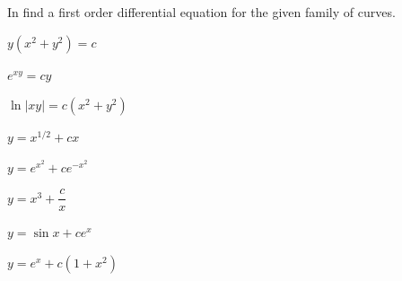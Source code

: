 \clearpage

\exercises
In   find a first order
differential equation for the given family of curves.

\begin{exerciselistTwoColumn}

\item\label{exer:4.5.1}$y(x^2+y^2)=c$
\item\label{exer:4.5.2}$e^{xy}=cy$
\item\label{exer:4.5.3}$\ln |xy|=c(x^2+y^2)$
\item\label{exer:4.5.4}$y=x^{1/2}+cx$
\item\label{exer:4.5.5}$y=e^{x^2}+ce^{-x^2}$
\item\label{exer:4.5.6}$y=x^3+\dfrac{c}{x}$
\item\label{exer:4.5.7}$y=\sin x+ce^x$
\item\label{exer:4.5.8}$y=e^x+c(1+x^2)$
\end{exerciselistTwoColumn}

